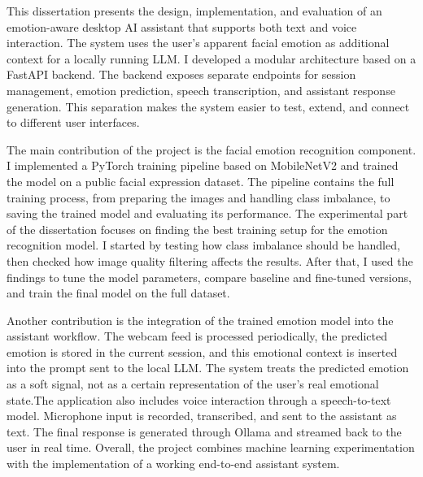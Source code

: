 This dissertation presents the design, implementation, and evaluation of an emotion-aware desktop AI assistant that supports both text and voice interaction. The system uses the user's apparent facial emotion as additional context for a locally running LLM. I developed a modular architecture based on a FastAPI backend. The backend exposes separate endpoints for session management, emotion prediction, speech transcription, and assistant response generation. This separation makes the system easier to test, extend, and connect to different user interfaces.

The main contribution of the project is the facial emotion recognition component. I implemented a PyTorch training pipeline based on MobileNetV2 and trained the model on a public facial expression dataset. The pipeline contains the full training process, from preparing the images and handling class imbalance, to saving the trained model and evaluating its performance. The experimental part of the dissertation focuses on finding the best training setup for the emotion recognition model. I started by testing how class imbalance should be handled, then checked how image quality filtering affects the results. After that, I used the findings to tune the model parameters, compare baseline and fine-tuned versions, and train the final model on the full dataset.

Another contribution is the integration of the trained emotion model into the assistant workflow. The webcam feed is processed periodically, the predicted emotion is stored in the current session, and this emotional context is inserted into the prompt sent to the local LLM. The system treats the predicted emotion as a soft signal, not as a certain representation of the user's real emotional state.The application also includes voice interaction through a speech-to-text model. Microphone input is recorded, transcribed, and sent to the assistant as text. The final response is generated through Ollama and streamed back to the user in real time. Overall, the project combines machine learning experimentation with the implementation of a working end-to-end assistant system.
